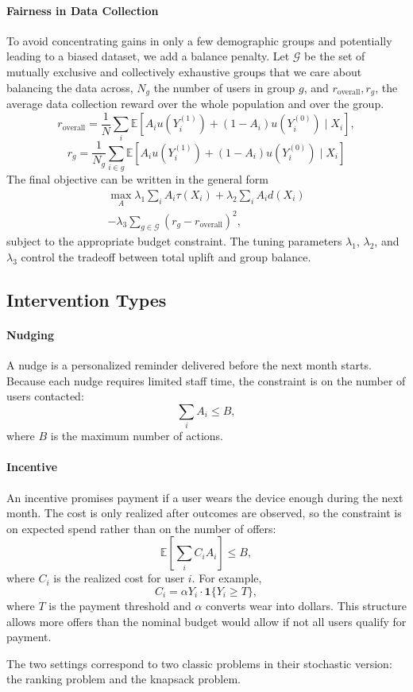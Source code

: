 \paragraph{Fairness in Data Collection}To avoid concentrating gains in only a few demographic groups and potentially leading to a biased dataset, we add a balance penalty. Let $\mathcal{G}$ be the set of mutually exclusive and collectively exhaustive groups that we care about balancing the data across, $N_g$ the number of users in group $g$, and $r_{\text{overall}}, r_g$, the average data collection reward over the whole population and over the group. 
\[
r_{\text{overall}} = \frac{1}{N}\sum_i \mathbb{E}\left[
A_i u(Y_i^{(1)})+(1-A_i)u(Y_i^{(0)}) \mid X_i
\right],
\]
\[
r_g =
\frac{1}{N_g}
\sum_{i\in g} \mathbb{E}
\left[
A_i u(Y_i^{(1)})+(1-A_i)u(Y_i^{(0)}) \mid X_i
\right]
\]
The final objective can be written in the general form
\begin{multline} \label{eq:obj}
\max_A \lambda_1 \sum_i A_i \tau(X_i) + \lambda_2 \sum_i A_i d(X_i)\\
- \lambda_3 \sum_{g \in \mathcal{G}}  \left(r_g - r_{\text{overall}}\right)^2,
\end{multline}
subject to the appropriate budget constraint. The tuning parameters $\lambda_1$, $\lambda_2$, and $\lambda_3$ control the tradeoff between total uplift and group balance. 

\subsection{Intervention Types}

\paragraph{Nudging}
A nudge is a personalized reminder delivered before the next month starts. Because each nudge requires limited staff time, the constraint is on the number of users contacted:
\[
\sum_i A_i \le B,
\]
where $B$ is the maximum number of actions.

\paragraph{Incentive}
An incentive promises payment if a user wears the device enough during the next month. The cost is only realized after outcomes are observed, so the constraint is on expected spend rather than on the number of offers:
\[
\mathbb{E}\left[\sum_i C_i A_i \right] \le B,
\]
where $C_i$ is the realized cost for user $i$. For example,
\[
C_i = \alpha Y_i \cdot \mathbf{1}\{Y_i \ge T\},
\]
where $T$ is the payment threshold and $\alpha$ converts wear into dollars. This structure allows more offers than the nominal budget would allow if not all users qualify for payment.

The two settings correspond to two classic problems in their stochastic version: the ranking problem and the knapsack problem. 

